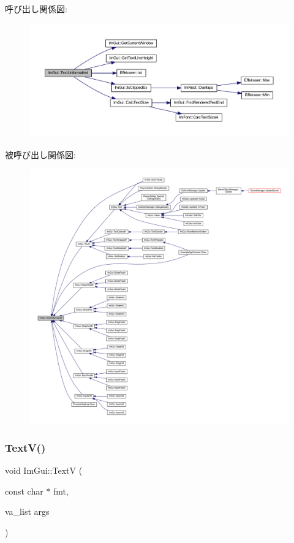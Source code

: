 呼び出し関係図\+:\nopagebreak
\begin{figure}[H]
\begin{center}
\leavevmode
\includegraphics[width=350pt]{namespace_im_gui_a96a5f42789ecc419b2ae8af7b2acc28e_cgraph}
\end{center}
\end{figure}
被呼び出し関係図\+:
\nopagebreak
\begin{figure}[H]
\begin{center}
\leavevmode
\includegraphics[width=350pt]{namespace_im_gui_a96a5f42789ecc419b2ae8af7b2acc28e_icgraph}
\end{center}
\end{figure}
\mbox{\label{namespace_im_gui_a10a0d6362178c2f743092f21e1b6cd20}} 
\subsubsection{\texorpdfstring{Text\+V()}{TextV()}}
{\footnotesize\ttfamily void Im\+Gui\+::\+TextV (\begin{DoxyParamCaption}\item[{const char $\ast$}]{fmt,  }\item[{va\+\_\+list}]{args }\end{DoxyParamCaption})}




